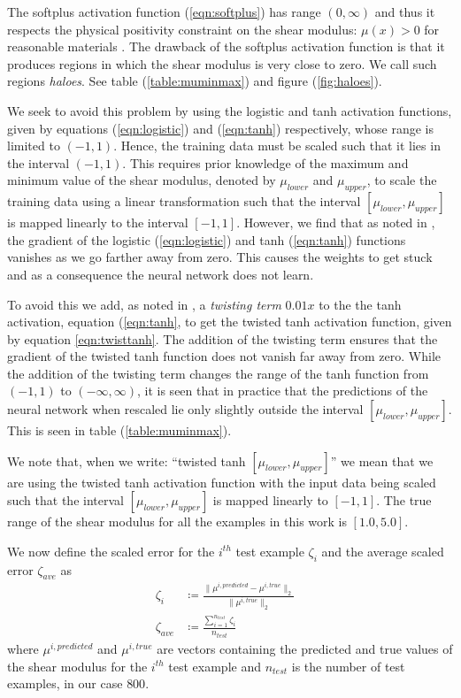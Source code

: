 \documentclass[12pt]{article}
\begin{document}
The softplus activation function (\ref{eqn:softplus}) has range $(0,\infty)$ and thus it respects the physical positivity constraint on the shear modulus: $\mu(x)>0$ for reasonable materials \cite{book:segelmathcont}. The drawback of the softplus activation function is that it produces regions in which the shear modulus is very close to zero. We call such regions \textit{haloes}. See table (\ref{table:muminmax}) and figure (\ref{fig:haloes}).

We seek to avoid this problem by using the logistic and tanh activation functions, given by equations (\ref{eqn:logistic}) and (\ref{eqn:tanh}) respectively, whose range is limited to $(-1,1)$. Hence, the training data must be scaled such that it lies in the interval $(-1,1)$. This requires prior knowledge of the maximum and minimum value of the shear modulus, denoted by $\mu_{lower}$ and $\mu_{upper}$, to scale the training data using a linear transformation such that the interval $[\mu_{lower},\mu_{upper}]$ is mapped linearly to the interval $[-1,1]$. However, we find that as noted in \cite{bookchap:lecun98b}, the gradient of the logistic (\ref{eqn:logistic}) and tanh (\ref{eqn:tanh}) functions vanishes as we go farther away from zero. This causes the weights to get stuck and as a consequence the neural network does not learn.

To avoid this we add, as noted in \cite{bookchap:lecun98b}, a \textit{twisting term} $0.01x$ to the the tanh activation, equation (\ref{eqn:tanh}, to get the twisted tanh activation function, given by equation \ref{eqn:twisttanh}. The addition of the twisting term ensures that the gradient of the twisted tanh function does not vanish far away from zero. While the addition of the twisting term changes the range of the tanh function from $(-1,1)$ to $(-\infty,\infty)$, it is seen that in practice that the predictions of the neural network when rescaled lie only slightly outside the interval $[\mu_{lower},\mu_{upper}]$. This is seen in table (\ref{table:muminmax}).

We note that, when we write: ``twisted tanh $[\mu_{lower},\mu_{upper}]$'' we mean that we are using the twisted tanh activation function with the input data being scaled such that the interval $[\mu_{lower},\mu_{upper}]$ is mapped linearly to $[-1,1]$. The true range of the shear modulus for all the examples in this work is $[1.0,5.0]$.

We now define the scaled error for the $i^{th}$  test example $\zeta_{i}$ and the average scaled error $\zeta_{ave}$ as
\begin{subequations}
  \begin{align}
  \zeta_{i} &\coloneqq \frac{\|\mu^{i,predicted} - \mu^{i,true}\|_{2}}{\|\mu^{i,true}\|_{2}}  &\label{eqn:scalederror}\\
  \zeta_{ave} &\coloneqq \frac{\sum_{i=1}^{n_{test}}\zeta_{i}}{n_{test}} &\label{eqn:averagescalederror}
  \end{align}
\end{subequations}
where $\mu^{i,predicted}$ and $\mu^{i,true}$ are vectors containing the predicted and true values of the shear modulus for the $i^{th}$ test example and $n_{test}$ is the number of test examples, in our case $800$.
\end{document}
